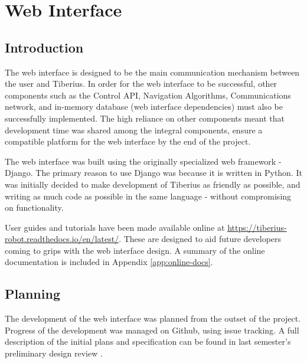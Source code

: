 
\section{Web Interface}
\pagestyle{cameron}

\subsection{Introduction}
The web interface is designed to be the main communication mechanism between the user and Tiberius. In order for the web interface to be successful, other components such as the Control API, Navigation Algorithms, Communications network, and in-memory database (web interface dependencies) must also be successfully implemented. The high reliance on other components meant that development time was shared among the integral components, ensure a compatible platform for the web interface by the end of the project.

The web interface was built using the originally specialized web framework - Django. The primary reason to use Django was because it is written in Python. It was initially decided to make development of Tiberius as friendly as possible, and writing as much code as possible in the same language - without compromising on functionality.

User guides and tutorials have been made available online at \url{https://tiberius-robot.readthedocs.io/en/latest/}. These are designed to aid future developers coming to grips with the web interface design. A summary of the online documentation is included in Appendix \ref{app:online-docs}.

\subsection{Planning}
The development of the web interface was planned from the outset of the project. Progress of the development was managed on Github, using issue tracking. A full description of the initial plans and specification can be found in last semester's preliminary design review \cite[p. ~132]{tibby-lit-review}.



